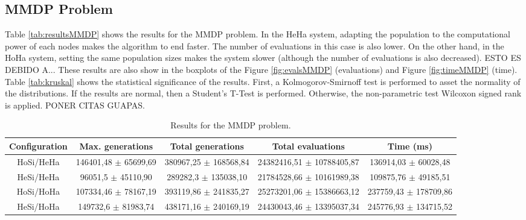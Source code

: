 \documentclass{sig-alternate}
\begin{document}
\subsection{MMDP Problem}

Table \ref{tab:resultsMMDP} shows the results for the MMDP problem. In the HeHa system, adapting the population to the computational power of each nodes makes the algorithm to end faster. The number of evaluations in this case is also lower. On the other hand, in the HoHa system, setting the same population sizes makes the system slower (although the number of evaluations is also decreased). ESTO ES DEBIDO A... These results are also show in the boxplots of the Figure \ref{fig:evalsMMDP} (evaluations) and Figure \ref{fig:timeMMDP} (time). Table \ref{tab:kruskal} shows the statistical significance of the results. First, a Kolmogorov-Smirnoff test is performed to asset the normality of the distributions. If the results are normal, then a Student's T-Test is performed. Otherwise, the non-parametric test Wilcoxon signed rank is applied. PONER CITAS GUAPAS.

\begin{table*}
\centering
\caption{Results for the MMDP problem.}
\begin{tabular}{|c|c|c|c|c|} \hline
Configuration	& Max. generations			& Total generations			& 	Total evaluations			& Time (ms) \\ \hline
HoSi/HeHa		& 146401,48	$\pm$ 65699,69	& 380967,25	$\pm$ 168568,84	& 24382416,51 $\pm$	10788405,87	& 136914,03 $\pm$ 60028,48\\ \hline
HeSi/HeHa		& 96051,5	$\pm$ 45110,90	& 289282,3	$\pm$ 135038,10	& 21784528,66 $\pm$	10161989,38	& 109875,76 $\pm$ 49185,51\\ \hline \hline
HoSi/HoHa		& 107334,46 $\pm$ 78167,19  & 393119,86 $\pm$ 241835,27	& 25273201,06 $\pm$ 15386663,12	& 237759,43 $\pm$ 178709,86\\ \hline
HeSi/HoHa		& 149732,6 $\pm$ 81983,74	& 438171,16	$\pm$ 240169,19	& 24430043,46 $\pm$ 13395037,34	& 245776,93 $\pm$ 134715,52\\ \hline

\end{tabular}
\end{table*}

\end{document}
